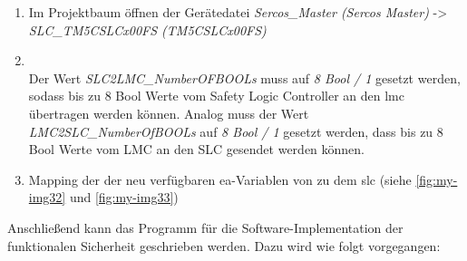 \documentclass[../../../Bachelorarbeit.tex]{subfiles}
\begin{document}
\begin{enumerate}
    \item Im Projektbaum öffnen der Gerätedatei \textit{Sercos\_Master (Sercos Master)} -> \\ \textit{SLC\_TM5CSLCx00FS (TM5CSLCx00FS)}
    \item \begin{minipage}[t]{\linewidth}
        \raggedright
        \label{fig:my-img40}
    \end{minipage}
    \bigskip \\
    Der Wert \textit{SLC2LMC\_NumberOFBOOLs} muss auf \textit{8 Bool / 1} gesetzt werden, sodass bis zu 8 Bool Werte vom Safety Logic Controller an den \acs{lmc} übertragen werden können. Analog muss der Wert \textit{LMC2SLC\_NumberOfBOOLs} auf \textit{8 Bool / 1} gesetzt werden, dass bis zu 8 Bool Werte vom \acs{LMC} an den \acs{SLC} gesendet werden können.
    \item Mapping der der neu verfügbaren \acs{ea}-Variablen von \bzw zu dem \acs{slc} (siehe \autoref{fig:my-img32} und \autoref{fig:my-img33})
\end{enumerate}

Anschließend kann das Programm für die Software-Implementation der funktionalen Sicherheit geschrieben werden. Dazu wird wie folgt vorgegangen:
\end{document}
